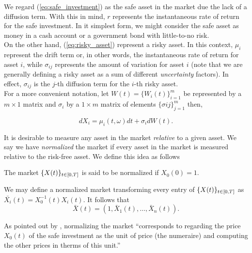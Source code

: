 \documentclass[../TGMAFFIRO.tex]{subfiles}
\begin{document}
We regard (\ref{eq:safe_investment}) as the safe asset in the market due the lack of a diffusion term. With this in mind, $r$ represents the instantaneous rate of return for the safe investment. In it simplest form, we might consider the safe asset as money in a cash account or a government bond with little-to-no risk.\\

On the other hand, (\ref{eq:risky_asset}) represent a risky asset. In this context, $\mu_i$ represent the drift term or, in other words, the instantaneous rate of return for asset $i$, while $\sigma_{ij}$ represents the amount of variation for asset $i$ (note that we are generally defining a risky asset as a sum of different \textit{uncertainty} factors). In effect, $\sigma_{ij}$ is the $j$-th diffusion term for the $i$-th risky asset.\\

For a more convenient notation, let $W(t) = \{W_i(t)\}_{i=1}^{m}$ be represented by a $m\times 1$ matrix and $\sigma_i$ by a $1\times m$ matrix of elements $\{\sigma{ij}\}_{j=1}^{m}$ then,

\begin{equation}
  dX_i = \mu_i(t,\omega) dt + \sigma_idW(t).
\end{equation}


It is desirable to measure any asset in the market \textit{relative} to a given asset. We say we have \textit{normalized} the market if every asset in the market is measured relative to the risk-free asset. We define this idea as follows
\begin{definition}
	The market $\{X(t)\}_{t\in[0,T]}$ is said to be normalized if $X_0(0)= 1$.
\end{definition}

We may define a normalized market transforming every entry of $\{X(t)\}_{t\in[0,T]}$ as $\bar{X_i}(t) = X_0^{-1}(t)X_i(t)$. It follows that
\begin{equation}
  \bar{X}(t) = (1, \bar{X}_1(t), \ldots, \bar{X}_n(t)).
\end{equation}

As pointed out by , normalizing the market ``corresponds to regarding the price $X_0(t)$ of the safe investment as the unit of price (the numeraire) and computing the other prices in therms of this unit.''
\end{document}
